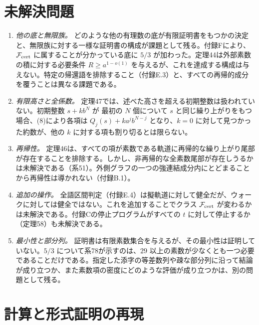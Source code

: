 \documentclass[11pt,reqno]{amsart}
\theoremstyle{definition}
\theoremstyle{definition}
\theoremstyle{remark}
\providecommand{\tightlist}{\setlength{\itemsep}{0pt}\setlength{\parskip}{0pt}}
\begin{document}
\section{未解決問題}\label{sec:11}

\begin{enumerate}
\def\labelenumi{\arabic{enumi}.}
\tightlist
\item
  \emph{他の底と無限族。} どのような他の有理数の底が有限証明書をもつかの決定と、無限族に対する一様な証明書の構成が課題として残る。付録Fにより、\(\mathcal F_{\rm cert}\) に属することが分かっている底に \(5/3\) が加わった。定理44は外部素数の積に対する必要条件 \(R\ge a^{1-o(1)}\) を与えるが、これを達成する構成は与えない。特定の帰還語を排除すること（付録E.3）と、すべての再帰的成分を覆うことは異なる課題である。
\item
  \emph{有限高さと全係数。} 定理47では、述べた高さを超える初期整数は扱われていない。初期整数 \(s+kb^N\) が 最初の \(N\) 個について \(s\) と同じ繰り上がりをもつ場合、(8)により各項は \(Q_j(s)+ka^jb^{N-j}\) となり、\(k=0\) に対して見つかった約数が、他の \(k\) に対する項も割り切るとは限らない。
\item
  \emph{再帰性。} 定理46は、すべての項が素数である軌道に再帰的な繰り上がり尾部が存在することを排除する。しかし、非再帰的な全素数尾部が存在しうるかは未解決である（系51）。外側グラフの一つの強連結成分内にとどまることから再帰性は導かれない（付録B.1）。
\item
  \emph{追加の操作。} 全語区間判定（付録E.4）は擬軌道に対して健全だが、ウォークに対しては健全ではない。これを追加することでクラス \(\mathcal F_{\rm cert}\) が変わるかは未解決である。付録Cの停止プログラムがすべての \(t\) に対して停止するか（定理58）も未解決である。
\item
  \emph{最小性と部分列。} 証明書は有限素数集合を与えるが、その最小性は証明していない。\(5/3\) について系78が示すのは、\(29\) 以上の素数が少なくとも一つ必要であることだけである。指定した添字の等差数列や疎な部分列に沿って結論が成り立つか、また素数項の密度にどのような評価が成り立つかは、別の問題として残る。
\end{enumerate}

\appendix
{}\section{計算と形式証明の再現}\label{app:A}
\end{document}
